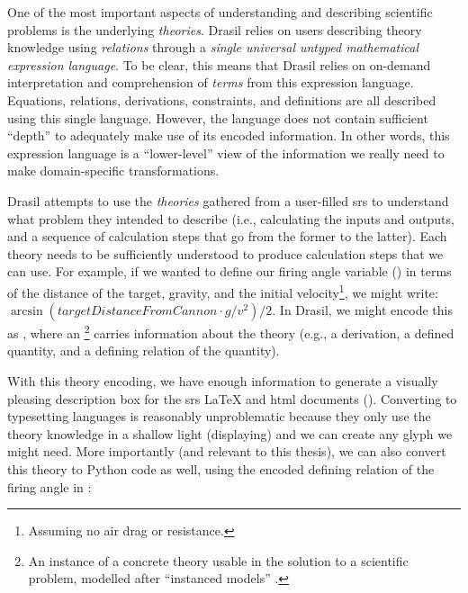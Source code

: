 One of the most important aspects of understanding and describing scientific
problems is the underlying \textit{theories}. Drasil relies on users describing
theory knowledge using \textit{relations} through a \textit{single universal
      untyped mathematical expression language}. To be clear, this means that Drasil
relies on on-demand interpretation and comprehension of \textit{terms} from this
expression language. Equations, relations, derivations, constraints, and
definitions are all described using this single language. However, the language
does not contain sufficient ``depth'' to adequately make use of its encoded
information. In other words, this expression language is a ``lower-level'' view
of the information we really need to make domain-specific transformations.

Drasil attempts to use the \textit{theories} gathered from a user-filled
\acs{srs} to understand what problem they intended to describe (i.e.,
calculating the inputs and outputs, and a sequence of calculation steps that go
from the former to the latter). Each theory needs to be sufficiently understood
to produce calculation steps that we can use. For example, if we wanted to
define our firing angle variable () in terms
of the distance of the target, gravity, and the initial
velocity\footnote{Assuming no air drag or resistance.}, we might write:
\(\arcsin{}(\mathit{targetDistanceFromCannon} \cdot{} g / v^2) / 2\). In Drasil,
we might encode this as , where an
\InstanceModel{}\footnote{An instance of a concrete theory usable in the
solution to a scientific problem, modelled after ``instanced models''
\cite{SmithAndLai2005}.} carries information about the theory (e.g., a
derivation, a defined quantity, and a defining relation of the quantity).

\exampleAngleEquationEncoding{}

With this theory encoding, we have enough information to generate a visually
pleasing description box for the \acs{srs} \LaTeX{} and \acs{html} documents
(). Converting to typesetting languages
is reasonably unproblematic because they only use the theory knowledge in a
shallow light (displaying) and we can create any glyph we might need. More
importantly (and relevant to this thesis), we can also convert this theory to
Python code as well, using the encoded defining relation of the firing angle in
:

\exampleAngleEquationEncodingToPython{}

